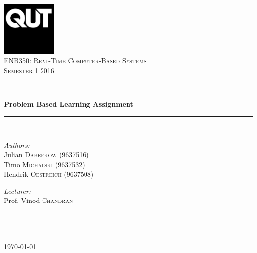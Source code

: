 \begin{titlepage}

\begin{center}


\includegraphics[width=0.20\textwidth]{./media/QUT_Square_black.jpg}\\[1cm]    

\textsc{\LARGE ENB350: Real-Time Computer-Based Systems}\\[1.5cm]

\textsc{\Large Semester 1 2016}\\[0.5cm]


\newcommand{\HRule}{\rule{\linewidth}{0.5mm}}
\HRule \\[0.6cm]
{ \huge \bfseries Problem Based Learning Assignment}\\[0.4cm]

\HRule \\[1.5cm]

\begin{minipage}{0.4\textwidth}
\begin{flushleft} \large
\emph{Authors:}\\
Julian \textsc{Daberkow} (9637516)\\
Timo \textsc{Michalski} (9637532)\\
Hendrik \textsc{Oestreich} (9637508)
\end{flushleft}
\end{minipage}
\hfill
\begin{minipage}{0.4\textwidth}
\begin{flushright} \large
\emph{Lecturer:} \\
Prof. Vinod \textsc{Chandran}\\
\hfill\\
\hfill\\
\hfill\\
\end{flushright}
\end{minipage}

\vfill

{\large \today}

\end{center}

\end{titlepage}
